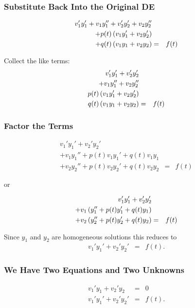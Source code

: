\begin{frame}
  \frametitle{Substitute Back Into the Original DE}

  \begin{eqnarray*}
    v_1' y_1' + v_1 y_1'' + v_2' y_2' + v_2 y_2'' & & \\
    + p(t) \left( v_1 y_1' + v_2 y_2' \right) & & \\
    + q(t) \left( v_1 y_1 + v_2 y_2 \right) & = & f(t)
  \end{eqnarray*}

  Collect the like terms:
  \begin{eqnarray*}
    v_1' y_1' + v_2' y_2'  & & \\
    + v_1 y_1'' + v_2 y_2'' & & \\
    p(t) \left( v_1 y_1' + v_2 y_2' \right) & & \\
    q(t) \left( v_1 y_1 + v_2 y_2 \right) & = & f(t)
  \end{eqnarray*}


\end{frame}


\begin{frame}
  \frametitle{Factor the Terms}

  \begin{eqnarray*}
    v_1' y_1' + v_2' y_2'  & & \\
    + v_1 y_1'' + p(t) v_1 y_1' + q(t) v_1 y_1 & & \\
    + v_2 y_2'' + p(t) v_2 y_2' + q(t) v_2 y_2 & = & f(t)
  \end{eqnarray*}

  or 

  \begin{eqnarray*}
    v_1' y_1' + v_2' y_2'  & & \\
    + v_1 \left( y_1'' + p(t) y_1' + q(t) y_1 \right) & & \\
    + v_2 \left( y_2'' + p(t) y_2' + q(t) y_2 \right) & = & f(t)
  \end{eqnarray*}

  Since $y_1$ and $y_2$ are homogeneous solutions this reduces to 
  \begin{eqnarray}
    \label{eqn:secondConstraint}
    v_1' y_1' + v_2' y_2'  & = & f(t).
  \end{eqnarray}


\end{frame}


\begin{frame}
  \frametitle{We Have Two Equations and Two Unknowns}

  \begin{eqnarray*}
    v_1' y_1 + v_2' y_2 & = & 0 \\
    v_1' y_1' + v_2' y_2'  & = & f(t).
  \end{eqnarray*}


\end{frame}


